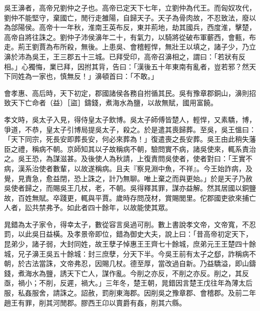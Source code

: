 
\begin{pinyinscope}
吳王濞者，高帝兄劉仲之子也。高帝已定天下七年，立劉仲為代王。而匈奴攻代，劉仲不能堅守，棄國亡，閒行走雒陽，自歸天子。天子為骨肉故，不忍致法，廢以為郃陽侯。高帝十一年秋，淮南王英布反，東并荊地，劫其國兵，西度淮，擊楚，高帝自將往誅之。劉仲子沛侯濞年二十，有氣力，以騎將從破布軍蘄西，會甀，布走。荊王劉賈為布所殺，無後。上患吳、會稽輕悍，無壯王以填之，諸子少，乃立濞於沛為吳王，王三郡五十三城。已拜受印，高帝召濞相之，謂曰：「若狀有反相。」心獨悔，業已拜，因拊其背，告曰：「漢後五十年東南有亂者，豈若邪？然天下同姓為一家也，慎無反！」濞頓首曰：「不敢。」

會孝惠、高后時，天下初定，郡國諸侯各務自拊循其民。吳有豫章郡銅山，濞則招致天下亡命者（益）［盜］鑄錢，煮海水為鹽，以故無賦，國用富饒。

孝文時，吳太子入見，得侍皇太子飲博。吳太子師傅皆楚人，輕悍，又素驕，博，爭道，不恭，皇太子引博局提吳太子，殺之。於是遣其喪歸葬。至吳，吳王慍曰：「天下同宗，死長安即葬長安，何必來葬為！」復遣喪之長安葬。吳王由此稍失藩臣之禮，稱病不朝。京師知其以子故稱病不朝，驗問實不病，諸吳使來，輒系責治之。吳王恐，為謀滋甚。及後使人為秋請，上復責問吳使者，使者對曰：「王實不病，漢系治使者數輩，以故遂稱病。且夫『察見淵中魚，不祥』。今王始詐病，及覺，見責急，愈益閉，恐上誅之，計乃無聊。唯上棄之而與更始。」於是天子乃赦吳使者歸之，而賜吳王几杖，老，不朝。吳得釋其罪，謀亦益解。然其居國以銅鹽故，百姓無賦。卒踐更，輒與平賈。歲時存問茂材，賞賜閭里。佗郡國吏欲來捕亡人者，訟共禁弗予。如此者四十餘年，以故能使其眾。

晁錯為太子家令，得幸太子，數從容言吳過可削。數上書說孝文帝，文帝寬，不忍罰，以此吳日益橫。及孝景帝即位，錯為御史大夫，說上曰：「昔高帝初定天下，昆弟少，諸子弱，大封同姓，故王孽子悼惠王王齊七十餘城，庶弟元王王楚四十餘城，兄子濞王吳五十餘城：封三庶孽，分天下半。今吳王前有太子之郄，詐稱病不朝，於古法當誅，文帝弗忍，因賜几杖。德至厚，當改過自新。乃益驕溢，即山鑄錢，煮海水為鹽，誘天下亡人，謀作亂。今削之亦反，不削之亦反。削之，其反亟，禍小；不削，反遲，禍大。」三年冬，楚王朝，晁錯因言楚王戊往年為薄太后服，私姦服舍，請誅之。詔赦，罰削東海郡。因削吳之豫章郡、會稽郡。及前二年趙王有罪，削其河閒郡。膠西王卬以賣爵有姦，削其六縣。


\end{pinyinscope}
